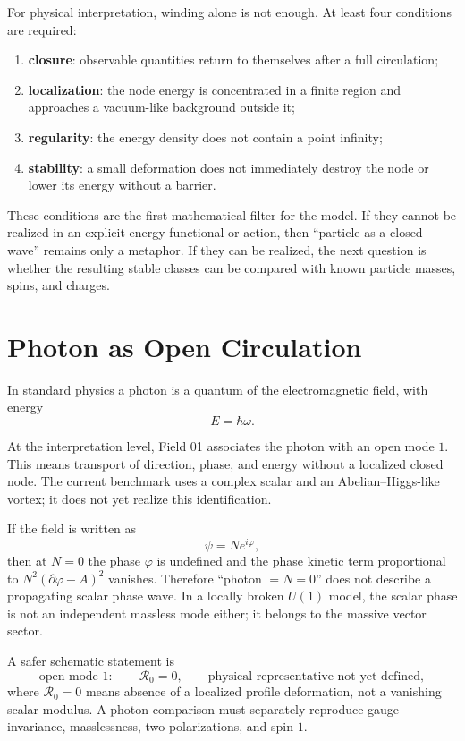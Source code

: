 \documentclass[11pt,a4paper]{article}
\newcommand{\phase}{\varphi}
\begin{document}
For physical interpretation, winding alone is not enough. At least four conditions are required:
\begin{enumerate}
\item \textbf{closure}: observable quantities return to themselves after a full circulation;
\item \textbf{localization}: the node energy is concentrated in a finite region and approaches a vacuum-like background outside it;
\item \textbf{regularity}: the energy density does not contain a point infinity;
\item \textbf{stability}: a small deformation does not immediately destroy the node or lower its energy without a barrier.
\end{enumerate}

These conditions are the first mathematical filter for the model. If they cannot be realized in an explicit energy functional or action, then ``particle as a closed wave'' remains only a metaphor. If they can be realized, the next question is whether the resulting stable classes can be compared with known particle masses, spins, and charges.

\section{Photon as Open Circulation}

In standard physics a photon is a quantum of the electromagnetic field, with energy
\begin{equation}
E = \hbar\omega.
\end{equation}

At the interpretation level, Field 01 associates the photon with an open mode $1$. This means transport of direction, phase, and energy without a localized closed node. The current benchmark uses a complex scalar and an Abelian--Higgs-like vortex; it does not yet realize this identification.

If the field is written as
\begin{equation}
\psi=Ne^{i\phase},
\end{equation}
then at $N=0$ the phase $\phase$ is undefined and the phase kinetic term proportional to $N^2(\partial\phase-A)^2$ vanishes. Therefore ``photon $=N=0$'' does not describe a propagating scalar phase wave. In a locally broken $U(1)$ model, the scalar phase is not an independent massless mode either; it belongs to the massive vector sector.

A safer schematic statement is
\begin{equation}
\text{open mode }1:
\qquad \mathcal{R}_0=0,
\qquad \text{physical representative not yet defined},
\end{equation}
where $\mathcal{R}_0=0$ means absence of a localized profile deformation, not a vanishing scalar modulus. A photon comparison must separately reproduce gauge invariance, masslessness, two polarizations, and spin $1$.
\end{document}
